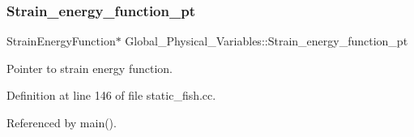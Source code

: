 \subsubsection{\texorpdfstring{Strain\+\_\+energy\+\_\+function\+\_\+pt}{Strain\_energy\_function\_pt}}
{\footnotesize\ttfamily Strain\+Energy\+Function$\ast$ Global\+\_\+\+Physical\+\_\+\+Variables\+::\+Strain\+\_\+energy\+\_\+function\+\_\+pt}



Pointer to strain energy function. 



Definition at line 146 of file static\+\_\+fish.\+cc.



Referenced by main().


